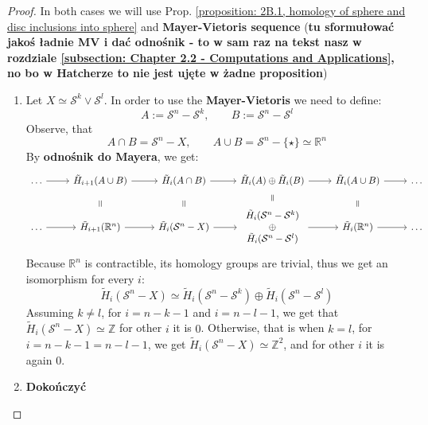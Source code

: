 \documentclass[11pt, a4paper, final]{amsart}
\newcommand{\R}{{\mathbb{R}}}
\newcommand{\Z}{{\mathbb{Z}}}
\newcommand\todo[1]{\textbf{\textcolor{redd}{#1}}}
\newcommand{\sphere}{\mathcal{S}}
\newcommand{\pt}{\star}
\numberwithin{theorem}{section}
\theoremstyle{definition}
\theoremstyle{remark}
\begin{document}
\begin{proof}
    In both cases we will use Prop. \ref{proposition: 2B.1, homology of sphere and disc inclusions into sphere} and {\bf Mayer-Vietoris sequence} (\todo{tu sformułować jakoś ładnie MV i dać odnośnik - to w sam raz na tekst nasz w rozdziale \ref{subsection: Chapter 2.2 - Computations and Applications}, no bo w Hatcherze to nie jest ujęte w żadne proposition})
    \begin{enumerate}[label=(a)]
        \item Let $X \simeq \sphere^k \vee \sphere ^l$. In order to use the {\bf Mayer-Vietoris} we need to define: 
        $$A := \sphere^n - \sphere^k, \;\;\;\;\;\;\; B := \sphere^n - \sphere^l$$
        Observe, that 
        $$A \cap B = \sphere^n - X, \;\;\;\;\;\;\; A \cup B = \sphere^n - \{\pt\} \simeq \R^n$$
        By \todo{odnośnik do Mayera}, we get:
        \[\begin{tikzcd}
	\dots & {\tilde{H}_{i+1}(A\cup B)} & {\tilde{H}_{i}(A\cap B)} & {\tilde{H}_{i}(A)\oplus\tilde{H}_{i}(B)} & {\tilde{H}_{i}(A\cup B)} & \dots \\
	\dots & {\tilde{H}_{i+1}(\R^n)} & {\tilde{H}_{i}(\sphere^n - X)} & \begin{array}{c}
    \tilde{H}_{i}(\sphere^n-\sphere^k) \\
    \oplus \\
    \tilde{H}_{i}(\sphere^n-\sphere^l)
\end{array} & {\tilde{H}_{i}(\R^n)} & \dots
	\arrow[from=1-1, to=1-2]
	\arrow[from=1-2, to=1-3]
	\arrow["{=}"{marking, allow upside down}, draw=none, from=1-2, to=2-2]
	\arrow[from=1-3, to=1-4]
	\arrow["{=}"{marking, allow upside down}, draw=none, from=1-3, to=2-3]
	\arrow[from=1-4, to=1-5]
	\arrow["{=}"{marking, allow upside down}, draw=none, from=1-4, to=2-4]
	\arrow[from=1-5, to=1-6]
	\arrow["{=}"{marking, allow upside down}, draw=none, from=1-5, to=2-5]
	\arrow[from=2-1, to=2-2]
	\arrow[from=2-2, to=2-3]
	\arrow[from=2-3, to=2-4]
	\arrow[from=2-4, to=2-5]
	\arrow[from=2-5, to=2-6]
    \end{tikzcd}\]
   Because $\R^n$ is contractible, its homology groups are trivial, thus we get an isomorphism for every $i$:
   $$\tilde{H}_{i}(\sphere^n - X) \simeq \tilde{H}_{i}(\sphere^n-\sphere^k) \oplus \tilde{H}_{i}(\sphere^n-\sphere^l)$$
   Assuming $k \neq l$, for $i = n - k - 1$ and $i = n - l - 1$, we get that $\tilde{H}_{i}(\sphere^n - X) \simeq \Z$ for other $i$ it is $0$. Otherwise, that is when $k = l$, for $i = n - k - 1 = n - l - 1$, we get $\tilde{H}_{i}(\sphere^n - X) \simeq \Z^2$, and for other $i$ it is again $0$.

   \item \todo{Dokończyć}
    \end{enumerate}
\end{proof}
\end{document}
